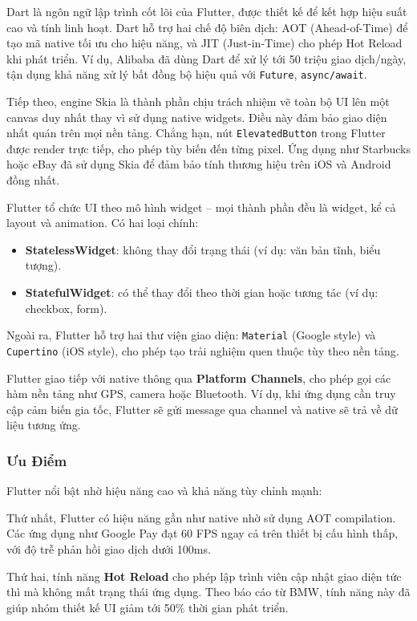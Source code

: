 Dart là ngôn ngữ lập trình cốt lõi của Flutter, được thiết kế để kết hợp hiệu suất cao và tính linh hoạt.  
Dart hỗ trợ hai chế độ biên dịch: AOT (Ahead-of-Time) để tạo mã native tối ưu cho hiệu năng, và JIT (Just-in-Time) cho phép Hot Reload khi phát triển.  
Ví dụ, Alibaba đã dùng Dart để xử lý tới 50 triệu giao dịch/ngày, tận dụng khả năng xử lý bất đồng bộ hiệu quả với \texttt{Future}, \texttt{async/await}.

Tiếp theo, engine Skia là thành phần chịu trách nhiệm vẽ toàn bộ UI lên một canvas duy nhất thay vì sử dụng native widgets.  
Điều này đảm bảo giao diện nhất quán trên mọi nền tảng.  
Chẳng hạn, nút \texttt{ElevatedButton} trong Flutter được render trực tiếp, cho phép tùy biến đến từng pixel.  
Ứng dụng như Starbucks hoặc eBay đã sử dụng Skia để đảm bảo tính thương hiệu trên iOS và Android đồng nhất.

Flutter tổ chức UI theo mô hình widget – mọi thành phần đều là widget, kể cả layout và animation.  
Có hai loại chính:
\begin{itemize}
    \item \textbf{StatelessWidget}: không thay đổi trạng thái (ví dụ: văn bản tĩnh, biểu tượng).
    \item \textbf{StatefulWidget}: có thể thay đổi theo thời gian hoặc tương tác (ví dụ: checkbox, form).
\end{itemize}

Ngoài ra, Flutter hỗ trợ hai thư viện giao diện: \texttt{Material} (Google style) và \texttt{Cupertino} (iOS style), cho phép tạo trải nghiệm quen thuộc tùy theo nền tảng.

Flutter giao tiếp với native thông qua \textbf{Platform Channels}, cho phép gọi các hàm nền tảng như GPS, camera hoặc Bluetooth.  
Ví dụ, khi ứng dụng cần truy cập cảm biến gia tốc, Flutter sẽ gửi message qua channel và native sẽ trả về dữ liệu tương ứng.

\subsubsection{Ưu Điểm}

\hspace*{1.5em}Flutter nổi bật nhờ hiệu năng cao và khả năng tùy chỉnh mạnh:

Thứ nhất, Flutter có hiệu năng gần như native nhờ sử dụng AOT compilation.  
Các ứng dụng như Google Pay đạt 60 FPS ngay cả trên thiết bị cấu hình thấp, với độ trễ phản hồi giao dịch dưới 100ms.

Thứ hai, tính năng \textbf{Hot Reload} cho phép lập trình viên cập nhật giao diện tức thì mà không mất trạng thái ứng dụng.  
Theo báo cáo từ BMW, tính năng này đã giúp nhóm thiết kế UI giảm tới 50\% thời gian phát triển.

